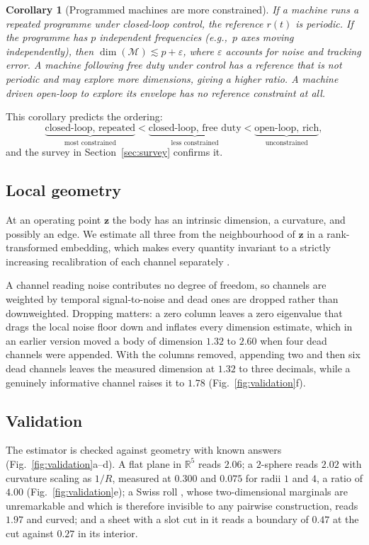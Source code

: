 \documentclass[11pt]{article}
\newtheorem{corollary}{Corollary}
\newcommand{\R}{\mathbb{R}}
\newcommand{\z}{\bm{z}}
\newcommand{\bdy}{\mathcal{M}}
\begin{document}
\begin{corollary}[Programmed machines are more constrained]
\label{cor:program}
If a machine runs a repeated programme under closed-loop control, the reference
$r(t)$ is periodic. If the programme has $p$ independent frequencies (e.g.,\ $p$
axes moving independently), then $\dim(\bdy) \lesssim p + \varepsilon$, where
$\varepsilon$ accounts for noise and tracking error. A machine following free
duty under control has a reference that is not periodic and may explore more
dimensions, giving a higher ratio. A machine driven open-loop to explore its
envelope has no reference constraint at all.
\end{corollary}

This corollary predicts the ordering:
\[
  \underbrace{\text{closed-loop, repeated}}_{\text{most constrained}}
  < \underbrace{\text{closed-loop, free duty}}_{\text{less constrained}}
  < \underbrace{\text{open-loop, rich}}_{\text{unconstrained}},
\]
and the survey in Section~\ref{sec:survey} confirms it.

\subsection{Local geometry}

At an operating point $\z$ the body has an intrinsic dimension, a curvature,
and possibly an edge. We estimate all three from the neighbourhood of $\z$ in a
rank-transformed embedding, which makes every quantity invariant to a strictly
increasing recalibration of each channel separately \cite{lehmann2006}.

A channel reading noise contributes no degree of freedom, so channels are
weighted by temporal signal-to-noise and dead ones are dropped rather than
downweighted. Dropping matters: a zero column leaves a zero eigenvalue that
drags the local noise floor down and inflates every dimension estimate, which
in an earlier version moved a body of dimension $1.32$ to $2.60$ when four
dead channels were appended. With the columns removed, appending two and then
six dead channels leaves the measured dimension at $1.32$ to three decimals,
while a genuinely informative channel raises it to $1.78$
(Fig.~\ref{fig:validation}f).

\subsection{Validation}

The estimator is checked against geometry with known answers
(Fig.~\ref{fig:validation}a--d). A flat plane in $\R^5$ reads $2.06$; a
$2$-sphere reads $2.02$ with curvature scaling as $1/R$, measured at $0.300$
and $0.075$ for radii $1$ and $4$, a ratio of $4.00$
(Fig.~\ref{fig:validation}e); a Swiss roll \cite{tenenbaum2000}, whose
two-dimensional marginals are unremarkable and which is therefore invisible to
any pairwise construction, reads $1.97$ and curved; and a sheet with a slot
cut in it reads a boundary of $0.47$ at the cut against $0.27$ in its interior.
\end{document}
